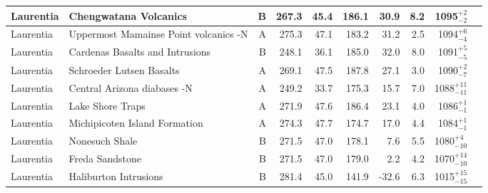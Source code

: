 \begin{longtable}{p{1 in}p{1 in}rrrrrrrp{1.5 in}}
                     Laurentia &                            Chengwatana Volcanics &      B &     267.3 &      45.4 & 186.1 &  30.9 &       8.2 &     1095$^{+2}_{-2}$ &                                  \cite{Kean1997a} \\ \hline
                     Laurentia &            Uppermost Mamainse Point volcanics -N &      A &     275.3 &      47.1 & 183.2 &  31.2 &       2.5 &     1094$^{+6}_{-4}$ &                         \cite{Swanson-Hysell2014a} \\ \hline
                     Laurentia &                  Cardenas Basalts and Intrusions &      B &     248.1 &      36.1 & 185.0 &  32.0 &       8.0 &     1091$^{+5}_{-5}$ &                                   \cite{Weil2003a} \\ \hline
                     Laurentia &                         Schroeder Lutsen Basalts &      A &     269.1 &      47.5 & 187.8 &  27.1 &       3.0 &     1090$^{+2}_{-7}$ &                              \cite{Fairchild2017a} \\ \hline
                     Laurentia &                      Central Arizona diabases -N &      A &     249.2 &      33.7 & 175.3 &  15.7 &       7.0 &   1088$^{+11}_{-11}$ &                               \cite{Donadini2011a} \\ \hline
                     Laurentia &                                 Lake Shore Traps &      A &     271.9 &      47.6 & 186.4 &  23.1 &       4.0 &     1086$^{+1}_{-1}$ &                                \cite{Kulakov2013a} \\ \hline
                     Laurentia &                    Michipicoten Island Formation &      A &     274.3 &      47.7 & 174.7 &  17.0 &       4.4 &     1084$^{+1}_{-1}$ &                              \cite{Fairchild2017a} \\ \hline
                     Laurentia &                                   Nonesuch Shale &      B &     271.5 &      47.0 & 178.1 &   7.6 &       5.5 &    1080$^{+4}_{-10}$ &                                  \cite{Henry1977a} \\ \hline
                     Laurentia &                                  Freda Sandstone &      B &     271.5 &      47.0 & 179.0 &   2.2 &       4.2 &   1070$^{+14}_{-10}$ &                                  \cite{Henry1977a} \\ \hline
                     Laurentia &                            Haliburton Intrusions &      B &     281.4 &      45.0 & 141.9 & -32.6 &       6.3 &   1015$^{+15}_{-15}$ &                                \cite{Warnock2000a} \\ \hline

\end{longtable}
